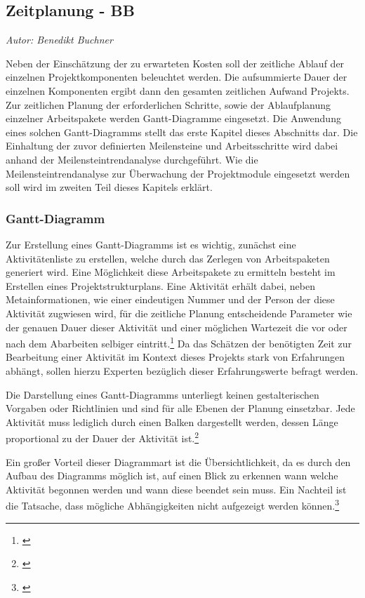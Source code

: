 \subsection{Zeitplanung - BB}
\textit{Autor: Benedikt Buchner}

Neben der Einschätzung der zu erwarteten Kosten soll der zeitliche Ablauf der einzelnen Projektkomponenten beleuchtet werden. Die aufsummierte Dauer der einzelnen Komponenten ergibt dann den gesamten zeitlichen Aufwand Projekts. Zur zeitlichen Planung der erforderlichen Schritte, sowie der Ablaufplanung einzelner Arbeitspakete werden Gantt-Diagramme eingesetzt. Die Anwendung eines solchen Gantt-Diagramms stellt das erste Kapitel dieses Abschnitts dar. Die Einhaltung der zuvor definierten Meilensteine und Arbeitsschritte wird dabei anhand der Meilensteintrendanalyse durchgeführt. Wie die Meilensteintrendanalyse zur Überwachung der Projektmodule eingesetzt werden soll wird im zweiten Teil dieses Kapitels erklärt.

\subsubsection{Gantt-Diagramm}
Zur Erstellung eines Gantt-Diagramms ist es wichtig, zunächst eine Aktivitätenliste zu erstellen, welche durch das Zerlegen von Arbeitspaketen generiert wird. Eine Möglichkeit diese Arbeitspakete zu ermitteln besteht im Erstellen eines Projektstrukturplans. Eine Aktivität erhält dabei, neben Metainformationen, wie einer eindeutigen Nummer und der Person der diese Aktivität zugwiesen wird, für die zeitliche Planung entscheidende Parameter wie der genauen Dauer dieser Aktivität und einer möglichen Wartezeit die vor oder nach dem Abarbeiten selbiger eintritt.\footnote{\cite{kraus_projekt_2010}}  Da das Schätzen der benötigten Zeit zur Bearbeitung einer Aktivität im Kontext dieses Projekts stark von Erfahrungen abhängt, sollen hierzu Experten bezüglich dieser Erfahrungswerte befragt werden.

Die Darstellung eines Gantt-Diagramms unterliegt keinen gestalterischen Vorgaben oder Richtlinien und sind für alle Ebenen der Planung einsetzbar. Jede Aktivität muss lediglich durch einen Balken dargestellt werden, dessen Länge proportional zu der Dauer der Aktivität ist.\footnote{\cite{jakoby_intensivtraining_2015}}

Ein großer Vorteil dieser Diagrammart ist die Übersichtlichkeit, da es durch den Aufbau des Diagramms möglich ist, auf einen Blick zu erkennen wann welche Aktivität begonnen werden und wann diese beendet sein muss. Ein Nachteil ist die Tatsache, dass mögliche Abhängigkeiten nicht aufgezeigt werden können.\footnote{\cite{kraus_projekt_2010}}

